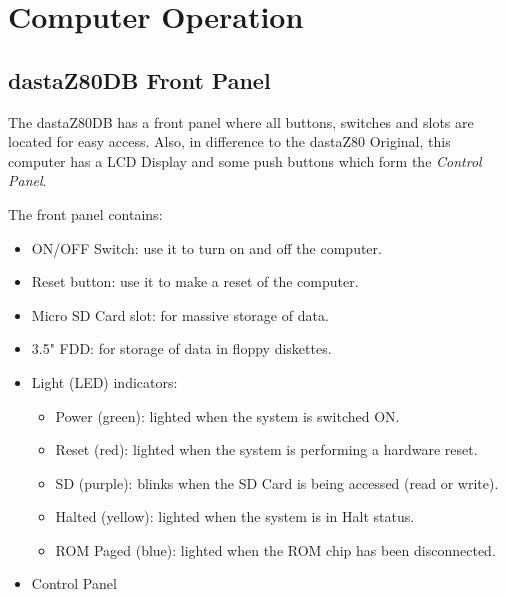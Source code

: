 \section{Computer Operation}
    
    \subsection{dastaZ80DB Front Panel}
    \label{subsec:frontpanel}

    The dastaZ80DB has a front panel where all buttons, switches and slots are
    located for easy access. Also, in difference to the dastaZ80 Original, this
    computer has a LCD Display and some push buttons which form the
    \textit{Control Panel}.

    The front panel contains:

    \begin{itemize}
        \item ON/OFF Switch: use it to turn on and off the computer.
        \item Reset button: use it to make a reset of the computer.
        \item Micro SD Card slot: for massive storage of data.
        \item 3.5" FDD: for storage of data in floppy diskettes.
        \item Light (LED) indicators:
        \begin{itemize}
            \item Power (green): lighted when the system is switched ON.
            \item Reset (red): lighted when the system is performing a hardware
                reset.
            \item SD (purple): blinks when the SD Card is being accessed
                (read or write).
            \item Halted (yellow): lighted when the system is in Halt status.
            \item ROM Paged (blue): lighted when the ROM chip has been
                disconnected.
        \end{itemize}
        \item Control Panel
    \end{itemize}

